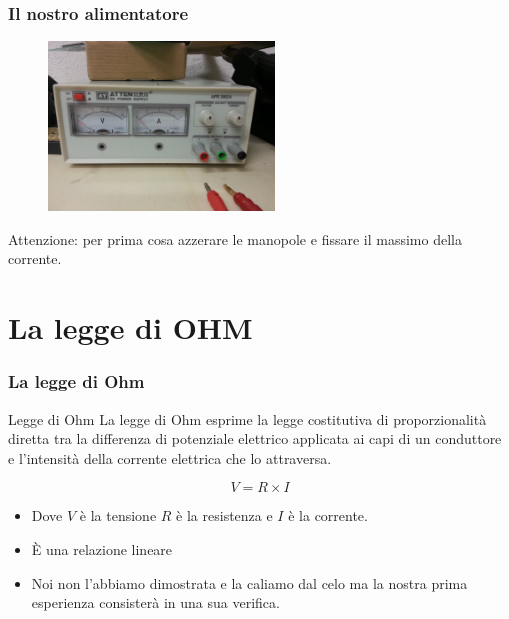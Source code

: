 		\begin{frame}[c]\frametitle{Il nostro alimentatore}
		    
			\begin{figure}[h]
				\centering
				\includegraphics[width= 6cm]{./img/alim.jpg}
				\label{fig:figure2}
			\end{figure}
			\color{red}Attenzione:
			\color{black}per prima cosa azzerare le manopole e fissare il massimo della corrente.
		
		\end{frame}


	\section{La legge di OHM} %
	\label{sec:la_legge_di_ohm}
		\begin{frame}[c]\frametitle{La legge di Ohm}
		     \begin{block}{Legge di Ohm}
		     	La legge di Ohm esprime la legge costitutiva di proporzionalità diretta tra la differenza di potenziale elettrico applicata ai capi di un conduttore e l'intensità della corrente elettrica che lo attraversa. 	
		     \end{block}
			\[
				V = R \times I
			\]

			\begin{itemize}
				\item Dove $V$ è la tensione $R$ è la resistenza e $I$ è la corrente.
				\pause
			 	\item \`E una relazione lineare
			 	\item Noi non l'abbiamo dimostrata e la caliamo dal celo ma la nostra prima esperienza consisterà in una sua verifica.
			 \end{itemize} 

		\end{frame}


